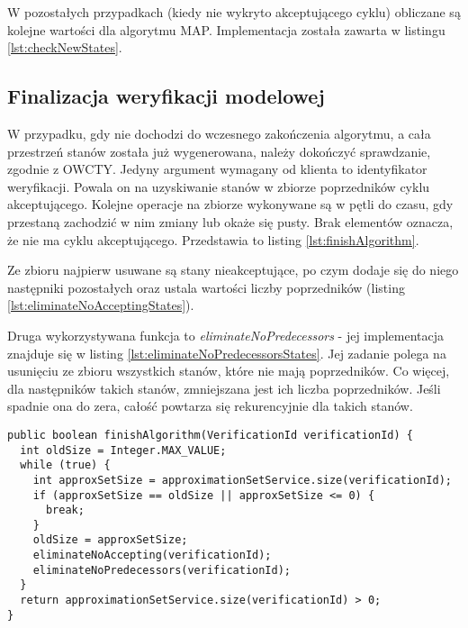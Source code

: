 W pozostałych przypadkach (kiedy nie wykryto akceptującego cyklu) obliczane są kolejne wartości dla algorytmu MAP. Implementacja została zawarta w listingu \ref{lst:checkNewStates}.


\subsection{Finalizacja weryfikacji modelowej}

W przypadku, gdy nie dochodzi do wczesnego zakończenia algorytmu, a cała przestrzeń stanów została już wygenerowana, należy dokończyć sprawdzanie, zgodnie z OWCTY.
Jedyny argument wymagany od klienta to identyfikator weryfikacji.
Powala on na uzyskiwanie stanów w zbiorze poprzedników cyklu akceptującego.
Kolejne operacje na zbiorze wykonywane są w pętli do czasu, gdy przestaną zachodzić w nim zmiany lub okaże się pusty.
Brak elementów oznacza, że nie ma cyklu akceptującego. 
Przedstawia to listing \ref{lst:finishAlgorithm}.

Ze zbioru najpierw usuwane są stany nieakceptujące, po czym dodaje się do niego następniki pozostałych oraz ustala wartości liczby poprzedników (listing \ref{lst:eliminateNoAcceptingStates}).

Druga wykorzystywana funkcja to \textit{eliminateNoPredecessors} - jej implementacja znajduje się w listing \ref{lst:eliminateNoPredecessorsStates}.
Jej zadanie polega na usunięciu ze zbioru wszystkich stanów, które nie mają poprzedników.
Co więcej, dla następników takich stanów, zmniejszana jest ich liczba poprzedników.
Jeśli spadnie ona do zera, całość powtarza się rekurencyjnie dla takich stanów.

\begin{minipage}{\linewidth}
\begin{lstlisting}[caption={Kod obsługujący algorytm w przypadku, gdy nie zakończy się wcześniej.},captionpos=b,label={lst:finishAlgorithm}]
public boolean finishAlgorithm(VerificationId verificationId) {
  int oldSize = Integer.MAX_VALUE;
  while (true) {
    int approxSetSize = approximationSetService.size(verificationId);
    if (approxSetSize == oldSize || approxSetSize <= 0) {
      break;
    }
    oldSize = approxSetSize;
    eliminateNoAccepting(verificationId);
    eliminateNoPredecessors(verificationId);
  }
  return approximationSetService.size(verificationId) > 0;
}
\end{lstlisting}
\end{minipage}

